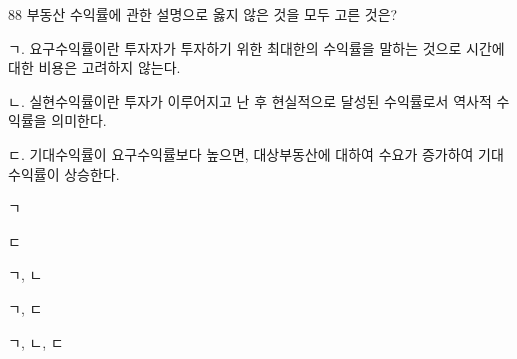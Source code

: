 \begin{question}{88}
부동산 수익률에 관한 설명으로 옳지 않은 것을 모두 고른 것은?
\begin{framedtext}
ㄱ. 요구수익률이란 투자자가 투자하기 위한 최대한의 수익률을 말하는 것으로 시간에 대한 비용은 고려하지 않는다. \par
ㄴ. 실현수익률이란 투자가 이루어지고 난 후 현실적으로 달성된 수익률로서 역사적 수익률을 의미한다. \par
ㄷ. 기대수익률이 요구수익률보다 높으면, 대상부동산에 대하여 수요가 증가하여 기대수익률이 상승한다.
\end{framedtext}
\begin{choices}
  \item ㄱ
  \item ㄷ
  \item ㄱ, ㄴ
  \item ㄱ, ㄷ
  \item ㄱ, ㄴ, ㄷ
\end{choices}
\end{question}
